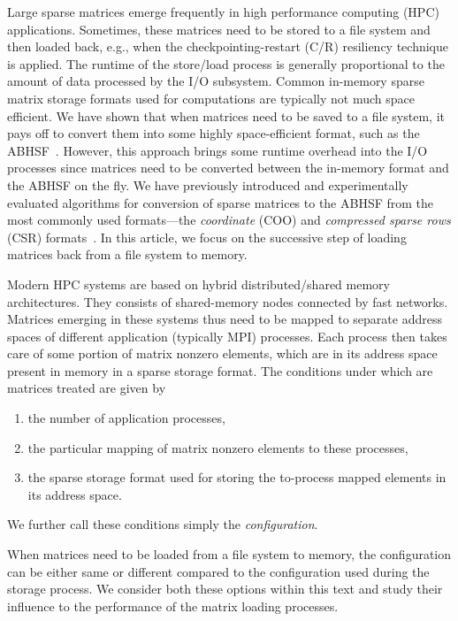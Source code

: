 \documentclass[10pt,a4paper]{article}
\begin{document}
Large sparse matrices emerge frequently in high performance computing (HPC) applications. Sometimes, these matrices need to be stored to a file system and then loaded back, e.g., when the checkpointing-restart (C/R) resiliency technique is applied. The runtime of the store/load process is generally proportional to the amount of data processed by the I/O subsystem. Common in-memory sparse matrix storage formats used for computations are typically not much space efficient. We have shown that when matrices need to be saved to a file system, it pays off to convert them into some highly space-efficient format, such as the ABHSF~\cite{Langr:2013a}. However, this approach brings some runtime overhead into the I/O processes since matrices need to be converted between the in-memory format and the ABHSF on the fly. 
We have previously introduced and experimentally evaluated algorithms for conversion of sparse matrices to the ABHSF from the most commonly used formats---the \emph{coordinate} (COO) and \emph{compressed sparse rows} (CSR) formats~\cite{Saad:2003,Barrett:1994}. In this article, we focus on the successive step of loading matrices back from a file system to memory. 

Modern HPC systems are based on hybrid distributed/shared memory architectures. They consists of shared-memory nodes connected by fast networks. Matrices emerging in these systems thus need to be mapped to separate address spaces of different application (typically MPI) processes. Each process then takes care of some portion of matrix nonzero elements, which are in its address space present in memory in a sparse storage format. The conditions under which are matrices treated are given by 
\begin{enumerate}
\item the number of application processes,
\item the particular mapping of matrix nonzero elements to these processes,
\item the sparse storage format used for storing the to-process mapped elements in its address space.
\end{enumerate}
We further call these conditions simply the \emph{configuration}.

When matrices need to be loaded from a file system to memory, the configuration can be either same or different compared to the configuration used during the storage process. We consider both these options within this text and study their influence to the performance of the matrix loading processes.
\end{document}
